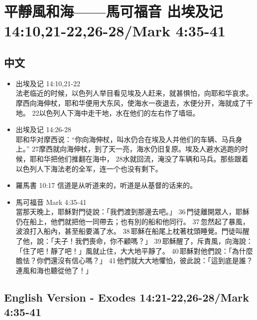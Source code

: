 
\section{平靜風和海——馬可福音 出埃及记 14:10,21-22,26-28/Mark 4:35-41}
\subsection{中文}
\begin{itemize}
\item 出埃及记 14:10,21-22 \\
法老临近的时候，以色列人举目看见埃及人赶来，就甚惧怕，向耶和华哀求。 摩西向海伸杖，耶和华便用大东风，使海水一夜退去，水便分开，海就成了干地。 22以色列人下海中走干地，水在他们的左右作了墙垣。
\item 出埃及记 14:26-28\\ 耶和华对摩西说：“你向海伸杖，叫水仍合在埃及人并他们的车辆、马兵身上。” 27摩西就向海伸杖，到了天一亮，海水仍旧复原。埃及人避水逃跑的时候，耶和华把他们推翻在海中， 28水就回流，淹没了车辆和马兵。那些跟着以色列人下海法老的全军，连一个也没有剩下。

\item 羅馬書 10:17 信道是从听道来的，听道是从基督的话来的。

\item 馬可福音 Mark 4:35-41 \\當那天晚上，耶穌對門徒說：「我們渡到那邊去吧。」 36 門徒離開眾人，耶穌仍在船上，他們就把他一同帶去；也有別的船和他同行。 37 忽然起了暴風，波浪打入船內，甚至船要滿了水。 38 耶穌在船尾上枕著枕頭睡覺。門徒叫醒了他，說：「夫子！我們喪命，你不顧嗎？」 39 耶穌醒了，斥責風，向海說：「住了吧！靜了吧！」風就止住，大大地平靜了。 40 耶穌對他們說：「為什麼膽怯？你們還沒有信心嗎？」 41 他們就大大地懼怕，彼此說：「這到底是誰？連風和海也聽從他了！」
\end{itemize}

\newpage
\subsection{English Version - Exodes 14:21-22,26-28/Mark 4:35-41}
